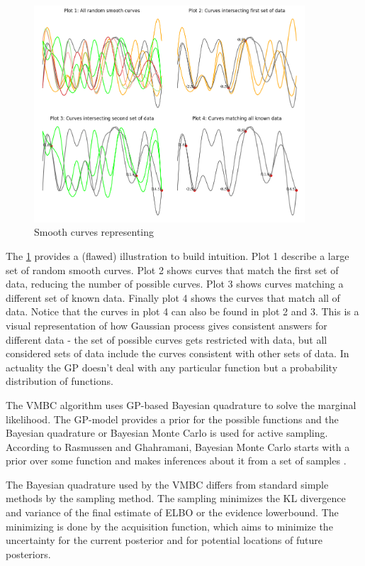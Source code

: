 \documentclass[english,oneside,openany]{UH_DS_report}
\begin{document}
\begin{figure}[h]
    \centering
    \includegraphics[width=0.9\textwidth]{plots.png}
    \caption{Smooth curves representing}
    \label{Fig:gp-curves}
\end{figure}

The \cref{Fig:gp-curves} provides a (flawed) illustration to build intuition. Plot 1 describe a large set of random smooth curves. Plot 2 shows
curves that match the first set of data, reducing the number of possible curves. Plot 3 shows curves matching
a different set of known data. Finally plot 4 shows the curves that match all of data. Notice that 
the curves in plot 4 can also be found in plot 2 and 3. This is a visual representation of how Gaussian process
gives consistent answers for different data - the set of possible curves gets restricted with data, but all
considered sets of data include the curves consistent with other sets of data. In actuality the GP doesn't 
deal with any particular function but a probability distribution of functions.

The VMBC algorithm uses GP-based Bayesian quadrature to solve the marginal likelihood. The GP-model provides a prior for the possible
functions and the Bayesian quadrature or Bayesian Monte Carlo is used for active sampling\cite{acerbi2018}. According to Rasmussen and Ghahramani, Bayesian Monte Carlo
starts with a prior over some function and makes inferences about it from a set of samples \cite{bayesian_mc}. 

The Bayesian quadrature used by the VMBC differs from standard simple methods by the sampling method. The sampling minimizes the
KL divergence and variance of the final estimate of ELBO or the evidence lowerbound. 
The minimizing is done by the acquisition function, which aims to 
minimize the uncertainty for the current posterior and for potential locations of future posteriors.\cite{acerbi2018}
\end{document}
